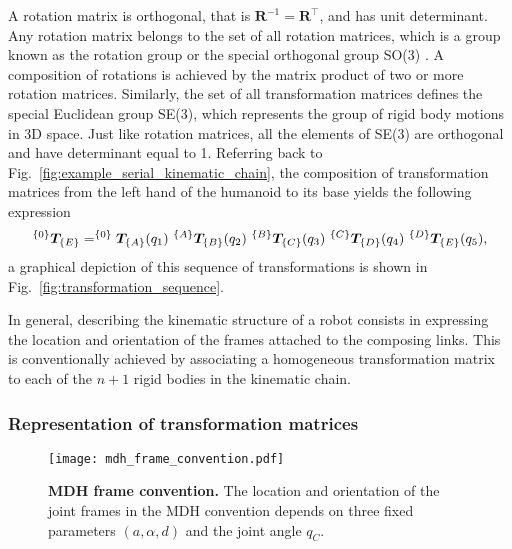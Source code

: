A rotation matrix is orthogonal, that is $ \bm{R}^{-1} = \bm{R}^\intercal$, and has unit determinant. Any rotation matrix belongs to the set of all rotation matrices, which is a group known as the rotation group or the special orthogonal group SO(3) \cite{Lynch2017Modernrobotics}. A composition of rotations is achieved by the matrix product of two or more rotation matrices. Similarly, the set of all transformation matrices defines the special Euclidean group SE(3), which represents the group of rigid body motions in 3D space. Just like rotation matrices, all the elements of SE(3) are orthogonal and have determinant equal to 1. Referring back to Fig.~\ref{fig:example_serial_kinematic_chain}, the composition of transformation matrices from the left hand of the humanoid to its base yields the following expression
\begin{equation}
	^{\left\lbrace 0 \right\rbrace}\bm{T}_{\left\lbrace E \right\rbrace} = 
	^{\left\lbrace 0 \right\rbrace}\bm{T}_{\left\lbrace A \right\rbrace}(q_1)~
	^{\left\lbrace A \right\rbrace}\bm{T}_{\left\lbrace B \right\rbrace}(q_2)~
	^{\left\lbrace B \right\rbrace}\bm{T}_{\left\lbrace C \right\rbrace}(q_3)~
	^{\left\lbrace C \right\rbrace}\bm{T}_{\left\lbrace D \right\rbrace}(q_4)~
	^{\left\lbrace D \right\rbrace}\bm{T}_{\left\lbrace E \right\rbrace}(q_5),
\end{equation}
a graphical depiction of this sequence of transformations is shown in Fig.~\ref{fig:transformation_sequence}.

In general, describing the kinematic structure of a robot consists in expressing the location and orientation of the frames attached to the composing links. This is conventionally achieved by associating a homogeneous transformation matrix to each of the $n+1$ rigid bodies in the kinematic chain.

\subsubsection{Representation of transformation matrices}
\begin{figure}
	\begin{center}
		\texttt{[image: mdh\_frame\_convention.pdf]}
		\caption{\textbf{MDH frame convention.} The location and orientation of the joint frames in the MDH convention depends on three fixed parameters $(a,\alpha,d)$ and the joint angle $q_C$.}
		\label{fig:mdh_frame_convention}
	\end{center}
\end{figure}
